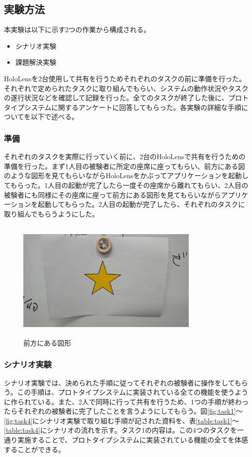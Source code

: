 \documentclass[11pt,a4j, titlepage]{jarticle} %
\begin{document}
\subsection{実験方法}
本実験は以下に示す2つの作業から構成される。

\begin{itemize}
 \item シナリオ実験
 \item 課題解決実験
\end{itemize}

HoloLensを2台使用して共有を行うためそれぞれのタスクの前に準備を行った。それぞれで定められたタスクに取り組んでもらい、システムの動作状況やタスクの遂行状況などを確認して記録を行った。全てのタスクが終了した後に、プロトタイプシステムに関するアンケートに回答してもらった。各実験の詳細な手順についてを以下で述べる。

\subsubsection{準備}
それぞれのタスクを実際に行っていく前に、2台のHoloLensで共有を行うための準備を行った。まず1人目の被験者に所定の座席に座ってもらい、前方にある図のような図形を見てもらいながらHoloLensをかぶってアプリケーションを起動してもらった。1人目の起動が完了したら一度その座席から離れてもらい、2人目の被験者にも同様にその座席に座って前方にある図形を見てもらいながらアプリケーションを起動してもらった。2人目の起動が完了したら、それぞれのタスクに取り組んでもらうようにした。

\begin{figure}[H]
  \begin{center}
    \includegraphics[clip,height=6.0cm,width=9.0cm]{./hoshi.eps}
    \caption{前方にある図形}
    \label{fig:hoshi}
  \end{center}
\end{figure}

\subsubsection{シナリオ実験}
シナリオ実験では、決められた手順に従ってそれぞれの被験者に操作をしてもらう。この手順は、プロトタイプシステムに実装されている全ての機能を使うように作られている。また、2人で同時に行って共有を行うため、1つの手順が終わったらそれぞれの被験者に完了したことを言うようにしてもらう。図\ref{fig:task1}～\ref{fig:task4}にシナリオ実験で取り組む手順が記された資料を、表\ref{table:task1}～\ref{table:task4}にシナリオの流れを示す。タスク1の内容は。この4つのタスクを一通り実施することで、プロトタイプシステムに実装されている機能の全てを体感することができる。
\end{document}
